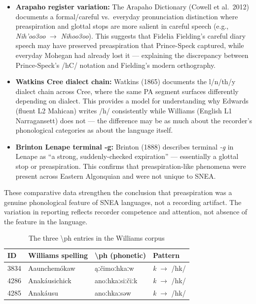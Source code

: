 \begin{itemize}
  \item \textbf{Arapaho register variation:} The Arapaho Dictionary (Cowell
    et al.\ 2012) documents a formal/careful vs.\ everyday pronunciation
    distinction where preaspiration and glottal stops are more salient in
    careful speech (e.g., \textit{Nih'oo3oo} $\rightarrow$ \textit{Nihoo3oo}).
    This suggests that Fidelia Fielding's careful diary speech may have
    preserved preaspiration that Prince-Speck captured, while everyday
    Mohegan had already lost it --- explaining the discrepancy between
    Prince-Speck's /hC/ notation and Fielding's modern orthography.

  \item \textbf{Watkins Cree dialect chain:} Watkins (1865) documents the
    l/n/th/y dialect chain across Cree, where the same PA segment surfaces
    differently depending on dialect. This provides a model for understanding
    why Edwards (fluent L2 Mahican) writes /h/ consistently while Williams
    (English L1 Narragansett) does not --- the difference may be as much about
    the recorder's phonological categories as about the language itself.

  \item \textbf{Brinton Lenape terminal -g:} Brinton (1888) describes
    terminal \textit{-g} in Lenape as ``a strong, suddenly-checked
    expiration'' --- essentially a glottal stop or preaspiration. This
    confirms that preaspiration-like phenomena were present across Eastern
    Algonquian and were not unique to SNEA.
\end{itemize}

These comparative data strengthen the conclusion that preaspiration was a
genuine phonological feature of SNEA languages, not a recording artifact.
The variation in reporting reflects recorder competence and attention, not
absence of the feature in the language.
\begin{table}[h]
\centering
\caption{The three \textbackslash ph entries in the Williams corpus}
\label{tab:williams-ph}
\begin{tabular}{llll}
\toprule
\textbf{ID} & \textbf{Williams spelling} & \textbf{\textbackslash ph (phonetic)} & \textbf{Pattern} \\
\midrule
3834 & Aaunchemókaw & ąːčimoːhkaːw & \textit{k} $\rightarrow$ /hk/ \\
4286 & Anakáusichick & anoːhkaːsiːčiːk & \textit{k} $\rightarrow$ /hk/ \\
4285 & Anakáusu & anoːhkaːsəw & \textit{k} $\rightarrow$ /hk/ \\
\bottomrule
\end{tabular}
\end{table}

